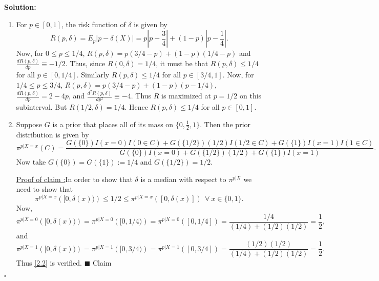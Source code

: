 \documentclass[12pt]{article}
\newcounter{ProofCounter}
\newcounter{ClaimCounter}[ProofCounter]
\newenvironment{Solution}{\stepcounter{ProofCounter}\textbf{Solution:}}{\hfill$\square$}
\newenvironment{claim}[1]{\vspace{1mm}\stepcounter{ClaimCounter}\par\noindent\underline{\bf Claim \theClaimCounter:}\space#1}{}
\newenvironment{claimproof}[1]{\par\noindent\underline{Proof of claim \theClaimCounter:}\space#1}{\hfill $\blacksquare$ Claim \theClaimCounter}
\begin{document}
\begin{Solution}
  \begin{enumerate}[label=(\alph*), leftmargin=6mm]
    \item For $p \in [0,1]$, the risk function of $\delta$ is given by
      \begin{equation}
        R(p, \delta) = E_p|p - \delta(X)| = p\left|p - \frac{3}{4}\right| + (1-p)\left|p - \frac{1}{4}\right|.
        \label{2.1}
      \end{equation}
      Now, for $0 \leq p \leq 1/4$, $R(p, \delta) = p(3/4 - p) + (1-p)(1/4 - p)$ and $\frac{dR(p,\delta)}{dp} \equiv -1/2$. Thus, since $R(0,\delta) =
      1/4$, it must be that $R(p, \delta) \leq 1/4$ for all $p \in [0,1/4]$. Similarly $R(p, \delta) \leq 1/4$ for all $p \in [3/4, 1]$. Now, for
      $1/4 \leq p \leq 3/4$, $R(p, \delta) = p(3/4 - p) + (1-p)(p - 1/4)$, $\frac{dR(p,\delta)}{dp} = 2 - 4p$, and $\frac{d^2R(p,\delta)}{dp^2} \equiv
      -4$. Thus $R$ is maximized at $p = 1/2$ on this subinterval. But $R(1/2, \delta) = 1/4$. Hence $R(p, \delta) \leq 1/4$ for all $p \in [0,1]$.

    \item Suppose $G$ is a prior that places all of its mass on $\{0, \frac{1}{2}, 1\}$. Then the prior distribution is given by
      \[
        \pi^{p|X=x}(C) = \frac{ G(\{0\})I(x = 0)I(0 \in C) + G(\{1/2\})(1/2)I(1/2 \in C) + G(\{1\})I(x=1)I(1\in C) }{  G(\{0\})I(x = 0) +
        G(\{1/2\})(1/2) + G(\{1\})I(x=1) }.
      \]
      Now take $G(\{0\}) = G(\{1\}) := 1/4$ and $G(\{1/2\}) = 1/2$.

      \begin{claimproof}
        In order to show that $\delta$ is a median with respect to $\pi^{p|X}$ we need to show that 
        \begin{equation}
          \pi^{p|X=x}\left( [0,\delta(x)) \right) \leq 1/2 \leq \pi^{p|X=x}\left( [0, \delta(x)] \right) \ \ \forall \ x \in \{0,1\}.
          \label{2.2}
        \end{equation}
        Now, 
        \[
          \pi^{p|X=0}\left( [0,\delta(x)) \right) = \pi^{p|X=0}\left( [0,1/4) \right) = \pi^{p|X=0}\left( [0,1/4] \right) = \frac{1/4}{(1/4) +
          (1/2)(1/2)} = \frac{1}{2},
        \]
        and
        \[
          \pi^{p|X=1}\left( [0,\delta(x)) \right) = \pi^{p|X=1}\left( [0,3/4) \right) = \pi^{p|X=1}\left( [0,3/4] \right) = \frac{(1/2)(1/2)}{(1/4) +
          (1/2)(1/2)} = \frac{1}{2}.
        \]
        Thus \eqref{2.2} is verified.
      \end{claimproof}


\end{enumerate}
\end{Solution}
\end{document}
